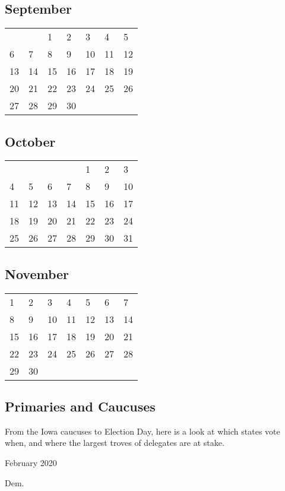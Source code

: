 \hypertarget{september}{%
\subsection{September}\label{september}}

\begin{longtable}[]{@{}lllllll@{}}
\toprule
\endhead
& & 1 & 2 & 3 & 4 & 5\tabularnewline
6 & 7 & 8 & 9 & 10 & 11 & 12\tabularnewline
13 & 14 & 15 & 16 & 17 & 18 & 19\tabularnewline
20 & 21 & 22 & 23 & 24 & 25 & 26\tabularnewline
27 & 28 & 29 & 30 & & &\tabularnewline
\bottomrule
\end{longtable}

\hypertarget{october}{%
\subsection{October}\label{october}}

\begin{longtable}[]{@{}lllllll@{}}
\toprule
\endhead
& & & & 1 & 2 & 3\tabularnewline
4 & 5 & 6 & 7 & 8 & 9 & 10\tabularnewline
11 & 12 & 13 & 14 & 15 & 16 & 17\tabularnewline
18 & 19 & 20 & 21 & 22 & 23 & 24\tabularnewline
25 & 26 & 27 & 28 & 29 & 30 & 31\tabularnewline
\bottomrule
\end{longtable}

\hypertarget{november}{%
\subsection{November}\label{november}}

\begin{longtable}[]{@{}lllllll@{}}
\toprule
\endhead
1 & 2 & 3 & 4 & 5 & 6 & 7\tabularnewline
8 & 9 & 10 & 11 & 12 & 13 & 14\tabularnewline
15 & 16 & 17 & 18 & 19 & 20 & 21\tabularnewline
22 & 23 & 24 & 25 & 26 & 27 & 28\tabularnewline
29 & 30 & & & & &\tabularnewline
\bottomrule
\end{longtable}

\hypertarget{primaries-and-caucuses}{%
\subsection{Primaries and Caucuses}\label{primaries-and-caucuses}}

From the Iowa caucuses to Election Day, here is a look at which states
vote when, and where the largest troves of delegates are at stake.

February 2020

Dem.

